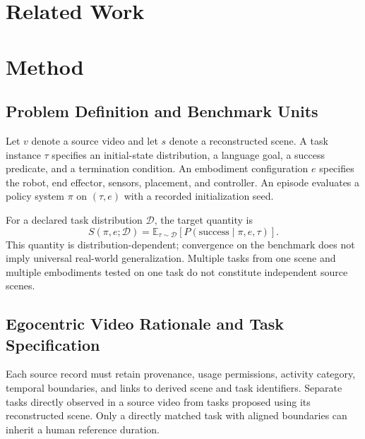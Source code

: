 \section{Related Work}
\label{sec:related_work}

\section{Method}
\label{sec:Method}

\subsection{Problem Definition and Benchmark Units}
\label{sec:gb_problem}
Let $v$ denote a source video and let $s$ denote a reconstructed scene. A task instance $\tau$ specifies an initial-state distribution, a language goal, a success predicate, and a termination condition. An embodiment configuration $e$ specifies the robot, end effector, sensors, placement, and controller. An episode evaluates a policy system $\pi$ on $(\tau,e)$ with a recorded initialization seed.

For a declared task distribution $\mathcal{D}$, the target quantity is
\begin{equation}
S(\pi,e;\mathcal{D})=\mathbb{E}_{\tau\sim\mathcal{D}}\!\left[P(\mathrm{success}\mid\pi,e,\tau)\right].
\end{equation}
This quantity is distribution-dependent; convergence on the benchmark does not imply universal real-world generalization. Multiple tasks from one scene and multiple embodiments tested on one task do not constitute independent source scenes.

\subsection{Egocentric Video Rationale and Task Specification}
\label{sec:gb_sources}
Each source record must retain provenance, usage permissions, activity category, temporal boundaries, and links to derived scene and task identifiers. Separate tasks directly observed in a source video from tasks proposed using its reconstructed scene. Only a directly matched task with aligned boundaries can inherit a human reference duration.


